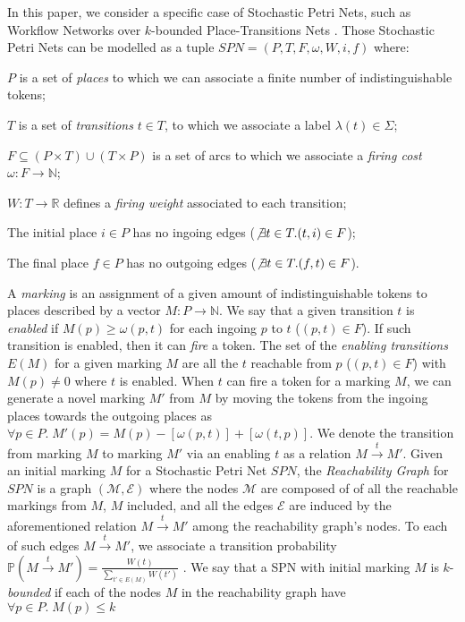 In this paper, we consider a specific case of Stochastic Petri Nets, such as Workflow Networks over $k$-bounded Place-Transitions Nets \cite{MarsanCB84,Desel1998,RoggeSoltiAW13}. Those Stochastic Petri Nets can be modelled as a tuple $SPN=(P,T,F,\omega,W,i,f)$ where:
\begin{mylist}
	\item $P$ is a set of \textit{places} to which we can associate a finite number of indistinguishable tokens;
	\item $T$ is a set of \textit{transitions} $t\in T$, to which we associate a label $\lambda(t)\in\Sigma$;
	\item $F\subseteq (P\times T)\cup (T\times P)$ is a set of arcs to which we associate a \textit{firing cost} $\omega\colon F\to\mathbb{N}$;
	\item $W\colon T\to \mathbb{R}$ defines a \textit{firing weight} associated to each transition;
	\item The initial place $i\in P$ has no ingoing edges ($\not\exists t\in T. (t,i)\in F$);
	\item The final place $f\in P$ has no outgoing edges ($\not\exists t\in T. (f,t)\in F$).
\end{mylist}
A \textit{marking} is an assignment of a given amount of indistinguishable tokens to places described by a vector $M\colon P\to \mathbb{N}$. We say that a given transition $t$ is \textit{enabled} if $M(p)\geq \omega(p,t)$ for each ingoing $p$ to $t$ ($(p,t)\in F$). If such transition is enabled, then it can \textit{fire} a token. The set of the \textit{enabling transitions} $E(M)$ for a given marking $M$ are all the $t$ reachable from $p$ ($(p,t)\in F$) with $M(p)\neq 0$ where $t$ is enabled. When $t$ can fire a token for a marking $M$, we can generate a novel marking $M'$ from $M$ by moving the tokens from the ingoing places towards the outgoing places as 
$\forall p\in P.\; M'(p)=M(p)-[\omega(p,t)]+[\omega(t,p)]$. 
We denote the transition from marking $M$ to marking $M'$ via an enabling $t$ as a relation $M\overset{t}{\to}M'$. Given an initial marking $M$ for a Stochastic Petri Net $SPN$,  the \textit{Reachability Graph} for $SPN$ is a graph $(\mathcal{M},\mathcal{E})$ where the nodes  $\mathcal{M}$ are composed of of all the reachable markings from $M$, $M$ included, and all the edges $\mathcal{E}$ are induced by the aforementioned relation $M\overset{t}{\to}M'$ among the reachability graph's nodes. To each of such edges $M\overset{t}{\to}M'$, we associate a transition probability $\mathbb{P}\left(M\overset{t}{\to}M'\right)=\frac{W(t)}{\sum_{t'\in E(M)}W(t')}$ \cite{spdwe}. We say that a SPN with initial marking $M$ is $k$-\textit{bounded} if each of the nodes $M$ in the reachability graph have $\forall p\in P.\; M(p)\leq k$\\

